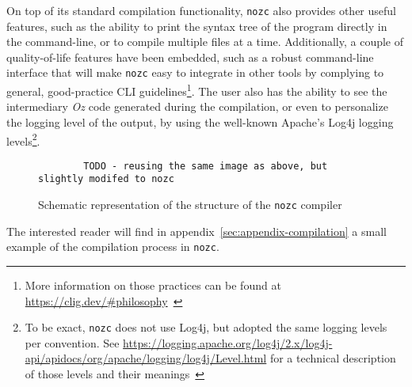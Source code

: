 On top of its standard compilation functionality, \texttt{nozc} also provides other useful features, such as the ability to print the syntax tree of the program directly in the command-line, or to compile multiple files at a time.
Additionally, a couple of quality-of-life features have been embedded, such as a robust command-line interface that will make \texttt{nozc} easy to integrate in other tools by complying to general, good-practice CLI guidelines\footnote{More information on those practices can be found at \url{https://clig.dev/\#philosophy}~\cite{clig}}.
The user also has the ability to see the intermediary \textit{Oz} code generated during the compilation, or even to personalize the logging level of the output, by using the well-known Apache's Log4j logging levels\footnote{To be exact, \texttt{nozc} does not use Log4j, but adopted the same logging levels per convention. See \url{https://logging.apache.org/log4j/2.x/log4j-api/apidocs/org/apache/logging/log4j/Level.html} for a technical description of those levels and their meanings~\cite{log4j}}.\newline
\begin{figure}
    \begin{lstlisting}
        TODO - reusing the same image as above, but slightly modifed to nozc
    \end{lstlisting}
    \caption{Schematic representation of the structure of the \texttt{nozc} compiler}
\end{figure}

The interested reader will find in appendix~\ref{sec:appendix-compilation} a small example of the compilation process in \texttt{nozc}.

